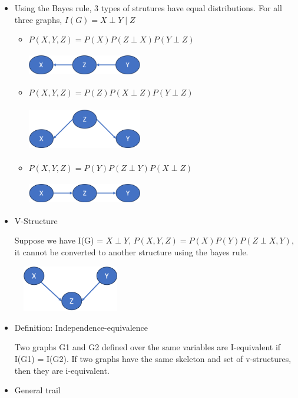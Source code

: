 \documentclass[11pt,a4paper]{report}
\begin{document}
\begin{itemize}
    \item Using the Bayes rule, 3 types of strutures have equal distributions. For all three graphs, $I(G) = {X \perp Y \mid Z}$
    \begin{itemize}
        \item $P(X,Y,Z) = P(X)P(Z \perp X)P(Y \perp Z)$
        
        \includegraphics[width = 5cm, height = 1cm]{equiv_1.png}
        \item $P(X,Y,Z) = P(Z)P(X \perp Z)P(Y \perp Z)$
        
        \includegraphics[width = 5cm, height = 2cm]{equiv_2.png}
        \item $P(X,Y,Z) = P(Y)P(Z \perp Y)P(X \perp Z)$
        
        \includegraphics[width = 5cm, height = 1cm]{equiv_3.png}
    \end{itemize}
    \item V-Structure
    
    Suppose we have I(G) = ${X \perp Y}$, $P(X,Y,Z) = P(X)P(Y)P(Z \perp X,Y)$, it cannot be converted to another structure using the bayes rule.

    \includegraphics[width = 5cm, height = 2cm]{v_structure.png}

    \item Definition: Independence-equivalence
    
    Two graphs G1 and G2 defined over the same variables are I-equivalent if I(G1) = I(G2). If two graphs have the same skeleton and set of v-structures, then they are i-equivalent.

    \item General trail
    

\end{itemize}
\end{document}
